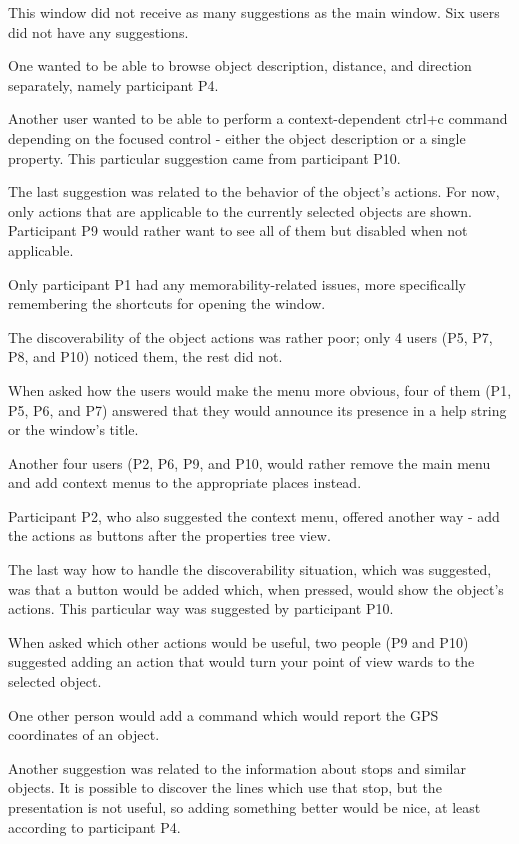 \documentclass[nolof,digital]{fithesis3}
\begin{document}
This window did not receive as many suggestions as the main window. Six users did not have any suggestions.

One wanted to be able to browse object description, distance, and direction separately, namely participant P4.

Another user wanted to be able to perform a context-dependent ctrl+c command depending on the focused control - either the object description or a single property. This particular suggestion came from participant P10.

The last suggestion was related to the behavior of the object's actions. For now, only actions that are applicable to the currently selected objects are shown. Participant P9 would rather want to see all of them but disabled when not applicable.

Only participant P1 had any memorability-related issues, more specifically remembering the shortcuts for opening the window.

The discoverability of the object actions was rather poor; only 4 users (P5, P7, P8, and P10) noticed them, the rest did not.

When asked how the users would make the menu more obvious, four of them (P1, P5, P6, and P7) answered that they would announce its presence in a help string or the window's title.

Another four users (P2, P6, P9, and P10, would rather remove the main menu and add context menus to the appropriate places instead.

Participant P2, who also suggested the context menu, offered another way - add the actions as buttons after the properties tree view.

The last way how to handle the discoverability situation, which was suggested, was that a button would be added which, when pressed, would show the object's actions. This particular way was suggested by participant P10.

When asked which other actions would be useful, two people (P9 and P10) suggested adding an action that would turn your point of view wards to the selected object.

One other person would add a command which would report the GPS coordinates of an object.

Another suggestion was related to the information about stops and similar objects. It is possible to discover the lines which use that stop, but the presentation is not useful, so adding something better would be nice, at least according to participant P4.
\end{document}
